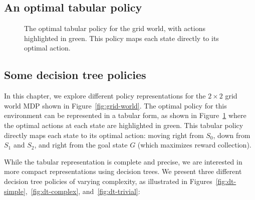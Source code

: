 \subsection{An optimal tabular policy}
\begin{figure}[ht]
\centering
{}
\caption{The optimal tabular policy for the grid world, with actions highlighted in green. This policy maps each state directly to its optimal action.}\label{fig:optimal-policy}
\end{figure}

\subsection{Some decision tree policies}

In this chapter, we explore different policy representations for the $2\times2$ grid world MDP shown in Figure~\ref{fig:grid-world}. The optimal policy for this environment can be represented in a tabular form, as shown in Figure~\ref{fig:optimal-policy} where the optimal actions at each state are highlighted in green. This tabular policy directly maps each state to its optimal action: moving right from $S_0$, down from $S_1$ and $S_2$, and right from the goal state $G$ (which maximizes reward collection).

While the tabular representation is complete and precise, we are interested in more compact representations using decision trees. We present three different decision tree policies of varying complexity, as illustrated in Figures~\ref{fig:dt-simple},~\ref{fig:dt-complex}, and~\ref{fig:dt-trivial}:

